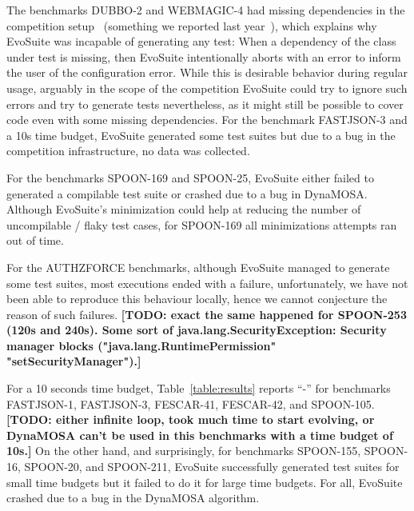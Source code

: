 \documentclass[sigconf,table]{acmart}
\newcommand{\TODO}[1]{\textbf{\textcolor{ScarletRed}{[TODO: #1]}}\xspace}
\newcommand{\TODO}[1]{}
\newcommand{\EVOSUITE}{{\sc EvoSuite}\xspace}
\begin{document}
The benchmarks DUBBO-2 and WEBMAGIC-4 had missing dependencies in the
competition setup~\cite{sbst19competition} (something we reported last
year~\cite{evosuiteAtSbst2018}), which explains why \EVOSUITE was incapable of
generating any test: When a dependency of the class under test is missing, then
\EVOSUITE intentionally aborts with an error to inform the user of the
configuration error. While this is desirable behavior during regular usage,
arguably in the scope of the competition \EVOSUITE could try to ignore such
errors and try to generate tests nevertheless, as it might still be possible to
cover code even with some missing dependencies. For the benchmark FASTJSON-3 and
a 10s time budget, \EVOSUITE generated some test suites but due to a bug in the
competition infrastructure, no data was collected. %

For the benchmarks SPOON-169 and SPOON-25, \EVOSUITE either failed to generated
a compilable test suite or crashed due to a bug in DynaMOSA. Although \EVOSUITE's
minimization could help at reducing the number of uncompilable / flaky test cases,
for SPOON-169 all minimizations attempts ran out of time.

For the AUTHZFORCE benchmarks, although \EVOSUITE managed to generate some test
suites, most executions ended with a failure, unfortunately, we have not been
able to reproduce this behaviour locally, hence we cannot conjecture the reason
of such failures. \TODO{exact the same happened for SPOON-253 (120s and 240s).
Some sort of java.lang.SecurityException: Security manager blocks ("java.lang.RuntimePermission" "setSecurityManager").}

For a 10 seconds time budget, Table~\ref{table:results} reports ``-'' for
benchmarks FASTJSON-1, FASTJSON-3, FESCAR-41, FESCAR-42, and SPOON-105.
\TODO{either infinite loop, took much time to start evolving, or DynaMOSA can't
be used in this benchmarks with a time budget of 10s.}
%
On the other hand, and surprisingly, for benchmarks SPOON-155, SPOON-16,
SPOON-20, and SPOON-211, \EVOSUITE successfully generated test suites for small
time budgets but it failed to do it for large time budgets. For all, \EVOSUITE
crashed due to a bug in the DynaMOSA algorithm.
\end{document}
